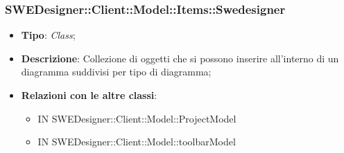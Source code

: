 \documentclass[../DefinizioneDiProdotto.tex]{subfiles}
\begin{document}
			\subsubsection{SWEDesigner::Client::Model::Items::Swedesigner}
			\hypertarget{SWEDesigner::Client::Model::Items::Swedesigner}{}
			\begin{itemize}
				\item \textbf{Tipo}: \emph{Class};
				\item \textbf{Descrizione}: Collezione di oggetti che si possono inserire all'interno di un diagramma suddivisi per tipo di diagramma;
				\item \textbf{Relazioni con le altre classi}:
				\begin{itemize}
					\item IN SWEDesigner::Client::Model::ProjectModel
					\item IN SWEDesigner::Client::Model::toolbarModel
				\end{itemize}
			\end{itemize}
			
			
\end{document}
